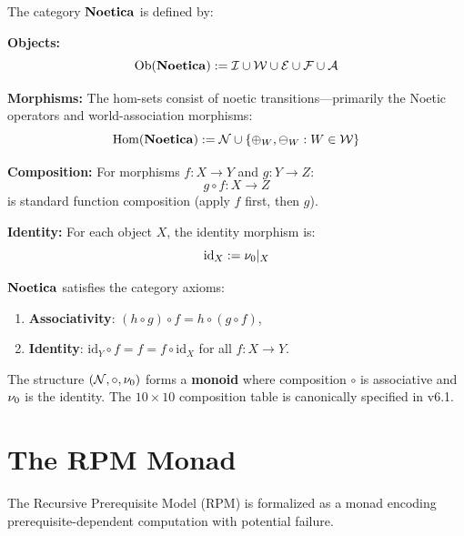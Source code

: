 \begin{definition}
\label{def:core-noetica}
The category $\mathbf{Noetica}$ is defined by:

\textbf{Objects:}
\[
    \mathrm{Ob}(\mathbf{Noetica}) := \mathcal{I} \cup \mathcal{W} \cup \mathcal{E} \cup \mathcal{F}
                             \cup \mathcal{A}
\]

\textbf{Morphisms:} The hom-sets consist of noetic transitions---primarily the
Noetic operators and world-association morphisms:
\[
    \mathrm{Hom}(\mathbf{Noetica}) := \mathcal{N} \cup \{\oplus_W, \ominus_W : W \in \mathcal{W}\}
\]

\textbf{Composition:} For morphisms $f : X \to Y$ and $g : Y \to Z$:
\[
    g \circ f : X \to Z
\]
is standard function composition (apply $f$ first, then $g$).

\textbf{Identity:} For each object $X$, the identity morphism is:
\[
    \mathrm{id}_X := \nu_{0}|_X
\]
\end{definition}

\begin{proposition}
\label{prop:noetica-category}
$\mathbf{Noetica}$ satisfies the category axioms:
\begin{enumerate}[label=(\alph*)]
    \item \textbf{Associativity}: $(h \circ g) \circ f = h \circ (g \circ f)$,
    \item \textbf{Identity}: $\mathrm{id}_Y \circ f = f = f \circ \mathrm{id}_X$
          for all $f : X \to Y$.
\end{enumerate}
\end{proposition}

\begin{definition}
\label{def:core-noetic-monoid}
The structure $(\mathcal{N}, \circ, \nu_{0})$ forms a \textbf{monoid} where composition
$\circ$ is associative and $\nu_{0}$ is the identity. The $10 \times 10$ composition
table is canonically specified in v6.1.
\end{definition}

\section{The RPM Monad}
\label{sec:rpm-monad}

The Recursive Prerequisite Model (RPM) is formalized as a monad encoding prerequisite-dependent
computation with potential failure.

